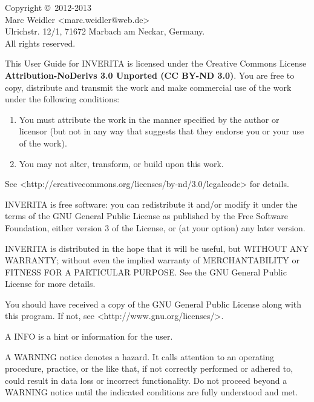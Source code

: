 Copyright \copyright\ 2012-2013\\
Marc Weidler <marc.weidler@web.de>\\
Ulrichstr. 12/1, 71672 Marbach am Neckar, Germany.\\
All rights reserved.

This User Guide for INVERITA is licensed under the Creative Commons License
\textbf{Attribution-NoDerivs 3.0 Unported (CC BY-ND 3.0)}.
You are free to copy, distribute and transmit the work and make
commercial use of the work under the following conditions:
\begin{enumerate}
\item You must attribute the work in the manner specified by the author or licensor (but not in any way that suggests that they endorse you or your use of the work).
\item You may not alter, transform, or build upon this work.
\end{enumerate}
See <http://creativecommons.org/licenses/by-nd/3.0/legalcode> for details.

INVERITA is free software: you can redistribute it and/or modify
it under the terms of the GNU General Public License as published by
the Free Software Foundation, either version 3 of the License, or
(at your option) any later version.

INVERITA is distributed in the hope that it will be useful,
but WITHOUT ANY WARRANTY; without even the implied warranty of
MERCHANTABILITY or FITNESS FOR A PARTICULAR PURPOSE.  See the
GNU General Public License for more details.

You should have received a copy of the GNU General Public License
along with this program.  If not, see <http://www.gnu.org/licenses/>.

\newpage

\begin{info}
A INFO is a hint or information for the user.
\end{info}
\begin{warning}
A WARNING notice denotes a hazard. It calls attention to an operating procedure, practice, or
the like that, if not correctly performed or adhered to, could result in data loss or incorrect functionality.
Do not proceed beyond a WARNING notice until the indicated conditions are fully understood and met.
\end{warning}


